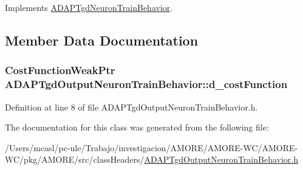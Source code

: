 Implements \hyperlink{class_a_d_a_p_tgd_neuron_train_behavior_a517162e38c48a87bf26aa01bfcecffa3}{ADAPTgdNeuronTrainBehavior}.



\subsection{Member Data Documentation}
\hypertarget{class_a_d_a_p_tgd_output_neuron_train_behavior_a86ef51f3abe6661fb7b36b2f78e8c0f0}{
\subsubsection[{d\_\-costFunction}]{\setlength{\rightskip}{0pt plus 5cm}CostFunctionWeakPtr {\bf ADAPTgdOutputNeuronTrainBehavior::d\_\-costFunction}}}
\label{class_a_d_a_p_tgd_output_neuron_train_behavior_a86ef51f3abe6661fb7b36b2f78e8c0f0}


Definition at line 8 of file ADAPTgdOutputNeuronTrainBehavior.h.



The documentation for this class was generated from the following file:\begin{DoxyCompactItemize}
\item 
/Users/mcasl/pc-\/ule/Trabajo/investigacion/AMORE/AMORE-\/WC/AMORE-\/WC/pkg/AMORE/src/classHeaders/\hyperlink{_a_d_a_p_tgd_output_neuron_train_behavior_8h}{ADAPTgdOutputNeuronTrainBehavior.h}\end{DoxyCompactItemize}

